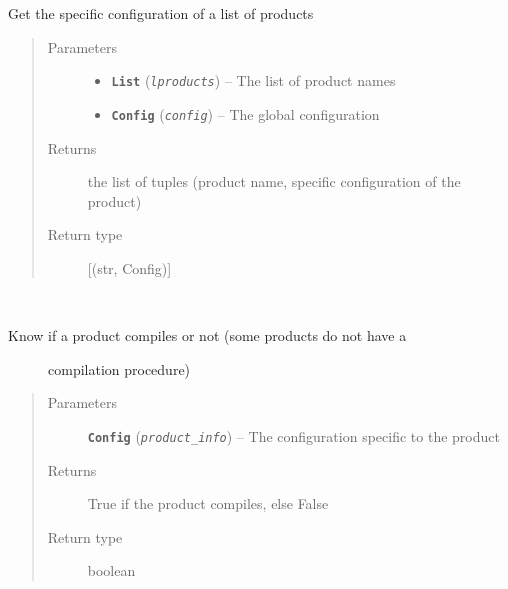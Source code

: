 \documentclass[a4paper,10pt,english]{sphinxmanual}
\begin{document}
\begin{fulllineitems}
\label{commands/apidoc/src:src.product.get_products_infos}
Get the specific configuration of a list of products
\begin{quote}\begin{description}
\item[{Parameters}] \leavevmode\begin{itemize}
\item {} 
\textbf{\texttt{List}} (\emph{\texttt{lproducts}}) -- The list of product names

\item {} 
\textbf{\texttt{Config}} (\emph{\texttt{config}}) -- The global configuration

\end{itemize}

\item[{Returns}] \leavevmode
the list of tuples 
(product name, specific configuration of the product)

\item[{Return type}] \leavevmode
{[}(str, Config){]}

\end{description}\end{quote}

\end{fulllineitems}


\begin{fulllineitems}
\label{commands/apidoc/src:src.product.product_compiles}~\begin{description}
\item[{Know if a product compiles or not (some products do not have a }] \leavevmode
compilation procedure)

\end{description}
\begin{quote}\begin{description}
\item[{Parameters}] \leavevmode
\textbf{\texttt{Config}} (\emph{\texttt{product\_info}}) -- The configuration specific to 
the product

\item[{Returns}] \leavevmode
True if the product compiles, else False

\item[{Return type}] \leavevmode
boolean

\end{description}\end{quote}

\end{fulllineitems}
\end{document}
